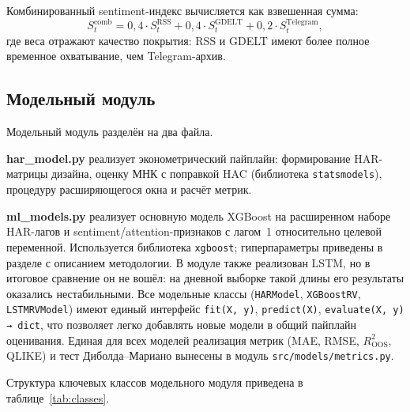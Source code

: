 Комбинированный sentiment-индекс вычисляется как взвешенная сумма:
\begin{equation}\label{eq:sent_comb}
    S_t^{\text{comb}} = 0{,}4 \cdot S_t^{\text{RSS}}
                      + 0{,}4 \cdot S_t^{\text{GDELT}}
                      + 0{,}2 \cdot S_t^{\text{Telegram}},
\end{equation}
где веса отражают качество покрытия: RSS и GDELT имеют более полное
временное охватывание, чем Telegram-архив.

\subsection{Модельный модуль}

Модельный модуль разделён на два файла.

\textbf{har\_model.py} реализует эконометрический пайплайн:
формирование HAR-матрицы дизайна, оценку МНК с поправкой HAC
(библиотека \texttt{statsmodels}), процедуру расширяющегося окна
и расчёт метрик.

\textbf{ml\_models.py} реализует основную модель XGBoost
на расширенном наборе HAR-лагов и sentiment/attention-признаков
с лагом~1 относительно целевой переменной.
Используется библиотека \texttt{xgboost}; гиперпараметры приведены
в разделе с описанием методологии.
В модуле также реализован LSTM, но в итоговое сравнение он не вошёл:
на дневной выборке такой длины его результаты оказались нестабильными.
Все модельные классы (\texttt{HARModel}, \texttt{XGBoostRV}, \texttt{LSTMRVModel})
имеют единый интерфейс \texttt{fit(X, y)}, \texttt{predict(X)},
\texttt{evaluate(X, y) → dict}, что позволяет легко добавлять новые
модели в общий пайплайн оценивания.
Единая для всех моделей реализация метрик (MAE, RMSE,
$R^2_{\mathrm{OOS}}$, QLIKE) и тест Диболда--Мариано вынесены
в модуль \texttt{src/models/metrics.py}.

Структура ключевых классов модельного модуля приведена
в таблице~\ref{tab:classes}.

